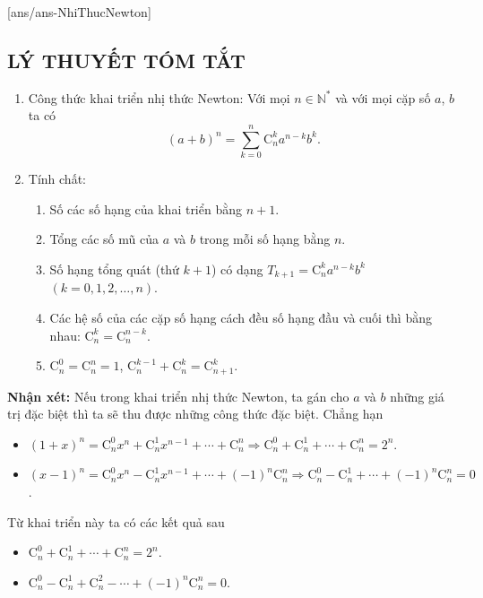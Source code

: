 [ans/ans-NhiThucNewton]

\subsection{LÝ THUYẾT TÓM TẮT}
\begin{enumerate}[1.]
	\item Công thức khai triển nhị thức Newton: Với mọi $n\in\mathbb{N}^*$ và với mọi cặp số $a$, $b$ ta có
	$$(a+b)^n=\displaystyle\sum\limits_{k=0}^{n}\mathrm{C}_n^ka^{n-k}b^k.$$
	\item Tính chất:
	\begin{enumerate}[1)]
		\item Số các số hạng của khai triển bằng $n+1$.
		\item Tổng các số mũ của $a$ và $b$ trong mỗi số hạng bằng $n$.
		\item Số hạng tổng quát (thứ $k+1$) có dạng $T_{k+1}=\mathrm{C}_n^ka^{n-k}b^k$ $(k=0,1,2,\ldots,n)$.
		\item Các hệ số của các cặp số hạng cách đều số hạng đầu và cuối thì bằng nhau: $\mathrm{C}_n^k=\mathrm{C}_n^{n-k}$.
		\item $\mathrm{C}_n^0=\mathrm{C}_n^n=1$, $\mathrm{C}_n^{k-1}+\mathrm{C}_n^k=\mathrm{C}_{n+1}^k$.
	\end{enumerate}
\end{enumerate}
\textbf{Nhận xét:} Nếu trong khai triển nhị thức Newton, ta gán cho $a$ và $b$ những giá trị đặc biệt thì ta sẽ thu được những công thức đặc biệt. Chẳng hạn
\begin{itemize}
	\item $(1+x)^n=\mathrm{C}_n^0x^n+\mathrm{C}_n^1x^{n-1}+\cdots+\mathrm{C}_n^n\Rightarrow \mathrm{C}_n^0+\mathrm{C}_n^1+\cdots+\mathrm{C}_n^n=2^n$.
	\item $(x-1)^n=\mathrm{C}_n^0x^n-\mathrm{C}_n^1x^{n-1}+\cdots+(-1)^n\mathrm{C}_n^n\Rightarrow \mathrm{C}_n^0-\mathrm{C}_n^1+\cdots+(-1)^n\mathrm{C}_n^n=0$.
\end{itemize}
Từ khai triển này ta có các kết quả sau
\begin{itemize}
	\item $\mathrm{C}_n^0+\mathrm{C}_n^1+\cdots+\mathrm{C}_n^n=2^n$.
	\item $\mathrm{C}_n^0-\mathrm{C}_n^1+\mathrm{C}_n^2-\cdots+(-1)^n\mathrm{C}_n^n=0$.
\end{itemize}

